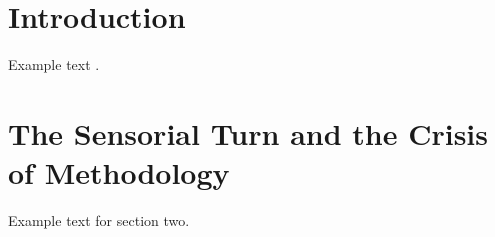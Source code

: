 \hypertarget{introduction}{%
\section{Introduction}\label{introduction}}

Example text \autocite{slawek_study_1994}.

\hypertarget{the-sensorial-turn-and-the-crisis-of-methodology}{%
\section{The Sensorial Turn and the Crisis of
Methodology}\label{the-sensorial-turn-and-the-crisis-of-methodology}}

Example text for section two.
